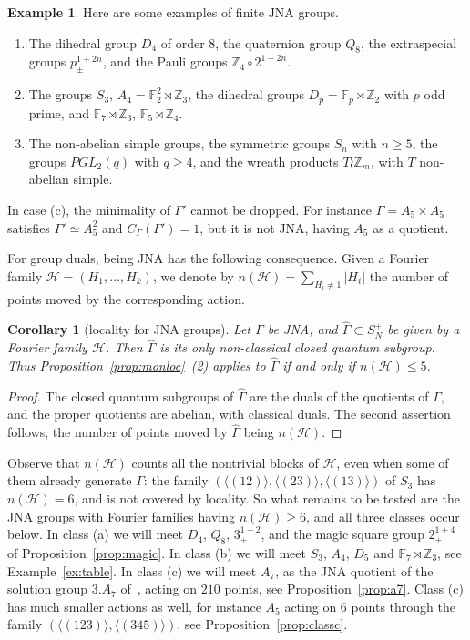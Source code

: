 \documentclass[11pt]{amsart}
\newtheorem{corollary}[theorem]{Corollary}
\theoremstyle{definition}
\newtheorem{example}[theorem]{Example}
\theoremstyle{remark}
\theoremstyle{plain}
\numberwithin{equation}{section}
\numberwithin{table}{section}
\newcommand{\Z}{\mathbb Z}
\newcommand{\F}{\mathbb F}
\begin{document}
\begin{example}\label{ex:jna}
Here are some examples of finite JNA groups.
\begin{enumerate}[label=(\alph*)]
\item The dihedral group $D_4$ of order $8$, the quaternion group $Q_8$, the extraspecial groups $p^{1+2n}_\pm$, and the Pauli groups $\Z_4\circ2^{1+2n}$.
\item The groups $S_3$, $A_4=\F_2^2\rtimes\Z_3$, the dihedral groups $D_p=\F_p\rtimes\Z_2$ with $p$ odd prime, and $\F_7\rtimes\Z_3$, $\F_5\rtimes\Z_4$.
\item The non-abelian simple groups, the symmetric groups $S_n$ with $n\ge5$, the groups $PGL_2(q)$ with $q\ge4$, and the wreath products $T\wr\Z_m$, with $T$ non-abelian simple.
\end{enumerate}
In case (c), the minimality of $\Gamma'$ cannot be dropped. For instance $\Gamma=A_5\times A_5$ satisfies $\Gamma'\simeq A_5^2$ and $C_\Gamma(\Gamma')=1$, but it is not JNA, having $A_5$ as a quotient.
\end{example}

For group duals, being JNA has the following consequence. Given a Fourier family $\mathcal H=(H_1,\dots,H_k)$, we denote by $n(\mathcal H)=\sum_{H_i\ne1}|H_i|$ the number of points moved by the corresponding action.

\begin{corollary}[locality for JNA groups]\label{cor:jnaloc}
Let $\Gamma$ be JNA, and $\widehat\Gamma\subset S_N^+$ be given by a Fourier family $\mathcal H$. Then $\widehat\Gamma$ is its only non-classical closed quantum subgroup. Thus Proposition~\ref{prop:monloc}~(2) applies to $\widehat\Gamma$ if and only if $n(\mathcal H)\le5$.
\end{corollary}

\begin{proof}
The closed quantum subgroups of $\widehat\Gamma$ are the duals of the quotients of $\Gamma$, and the proper quotients are abelian, with classical duals. The second assertion follows, the number of points moved by $\widehat\Gamma$ being $n(\mathcal H)$.
\end{proof}

Observe that $n(\mathcal H)$ counts all the nontrivial blocks of $\mathcal H$, even when some of them already generate $\Gamma$: the family $(\langle(12)\rangle,\langle(23)\rangle,\langle(13)\rangle)$ of $S_3$ has $n(\mathcal H)=6$, and is not covered by locality. So what remains to be tested are the JNA groups with Fourier families having $n(\mathcal H)\ge6$, and all three classes occur below. In class (a) we will meet $D_4$, $Q_8$, $3^{1+2}_+$, and the magic square group $2^{1+4}_+$ of Proposition~\ref{prop:magic}. In class (b) we will meet $S_3$, $A_4$, $D_5$ and $\F_7\rtimes\Z_3$, see Example~\ref{ex:table}. In class (c) we will meet $A_7$, as the JNA quotient of the solution group $3.A_7$ of~\cite{drs}, acting on $210$ points, see Proposition~\ref{prop:a7}. Class (c) has much smaller actions as well, for instance $A_5$ acting on $6$ points through the family $(\langle(123)\rangle,\langle(345)\rangle)$, see Proposition~\ref{prop:classc}.
\end{document}
